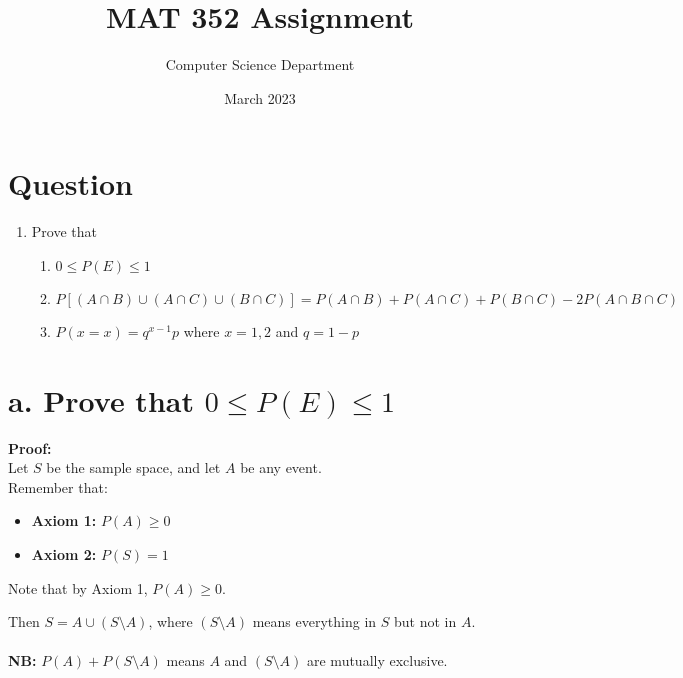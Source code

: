 \documentclass{article}
\title{MAT 352 Assignment}
\author{Computer Science Department}
\date{March 2023}
\begin{document}
\maketitle


\section*{Question}
\begin{enumerate}
    \item Prove that
        \begin{enumerate}[label=(\alph*)]
            \item $0 \leq P(E) \leq 1$
            \item $P[(A \cap B) \cup (A \cap C) \cup (B \cap C)] = P(A \cap B) + P(A \cap C) + P(B \cap C) - 2P(A \cap B \cap C)$
            \item $P(x=x) = q^{x-1}p$ where $x=1,2$ and $q = 1-p$
        \end{enumerate}
\end{enumerate}



\newpage

\section*{a. Prove that $0 \leq P(E) \leq 1$}

\textbf{Proof:}\\

Let $S$ be the sample space, and let $A$ be any event.\\

Remember that:
\begin{itemize}
    \item \textbf{Axiom 1:} $P(A) \geq 0$
    \item \textbf{Axiom 2:} $P(S) = 1$
\end{itemize}

Note that by Axiom 1, $P(A) \geq 0$.

Then $S = A \cup (S \setminus A)$, where $(S \setminus A)$ means everything in $S$ but not in $A$.
\\
\\
\textbf{NB:} $P(A) + P(S \setminus A)$ means $A$ and $(S \setminus A)$ are mutually exclusive.
\\
\\
\end{document}
